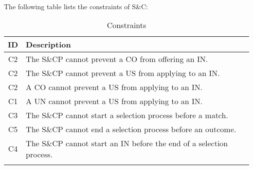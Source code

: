 The following table lists the constraints of S\&C: 

\renewcommand{\arraystretch}{1.5}
\begin{longtable}{|c|p{12.5cm}|}
    \hline \rowcolor{polimiblue!40}
    \textbf{ID} & \textbf{Description} \\ \hline \hline
    C2 & The S\&CP cannot prevent a CO from offering an IN. \\ \hline
    C2 & The S\&CP cannot prevent a US from applying to an IN. \\ \hline
    C2 & A CO cannot prevent a US from applying to an IN. \\ \hline
    C1 & A UN cannot prevent a US from applying to an IN. \\ \hline
    C3 & The S\&CP cannot start a selection process before a match. \\ \hline
    C5 & The S\&CP cannot end a selection process before an outcome. \\ \hline
    C4 & The S\&CP cannot start an IN before the end of a selection process. \\ \hline
\caption{Constraints}
\end{longtable}
